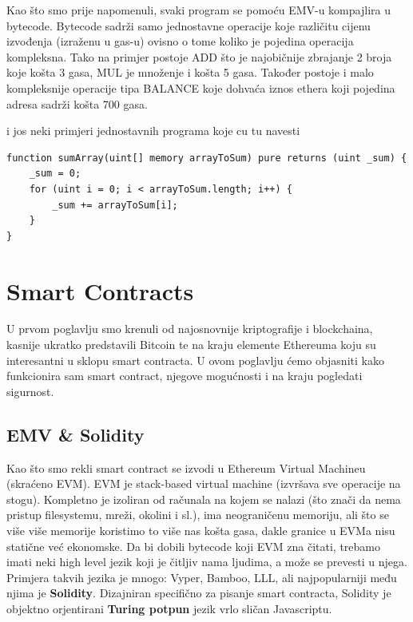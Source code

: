 \documentclass[12pt]{report}
\begin{document}
Kao što smo prije napomenuli, svaki program se pomoću EMV-u kompajlira u bytecode. Bytecode sadrži samo jednostavne operacije koje različitu cijenu izvođenja (izraženu u gas-u) ovisno o tome koliko je pojedina operacija kompleksna. Tako na primjer postoje ADD što je najobičnije zbrajanje 2 broja koje košta 3 gasa, MUL je množenje i košta 5 gasa. Također postoje i malo kompleksnije operacije tipa BALANCE koje dohvaća iznos ethera koji pojedina adresa sadrži košta 700 gasa.

i jos neki primjeri jednostavnih programa koje cu tu navesti

\begin{lstlisting}[caption = Primjer 1, language=solidity, label={lst:suma}]
function sumArray(uint[] memory arrayToSum) pure returns (uint _sum) {
    _sum = 0;
    for (uint i = 0; i < arrayToSum.length; i++) {
        _sum += arrayToSum[i];
    }
}
\end{lstlisting}

\chapter{Smart Contracts}

U prvom poglavlju smo krenuli od najosnovnije kriptografije i blockchaina, kasnije ukratko predstavili Bitcoin te na kraju elemente Ethereuma koju su interesantni u sklopu smart contracta. U ovom poglavlju ćemo objasniti kako funkcionira sam smart contract, njegove mogućnosti i na kraju pogledati sigurnost.

\section{EMV \& Solidity}

Kao što smo rekli smart contract se izvodi u Ethereum Virtual Machineu (skraćeno EVM). EVM je stack-based virtual machine (izvršava sve operacije na stogu). Kompletno je izoliran od računala na kojem se nalazi (što znači da nema pristup filesystemu, mreži, okolini i sl.), ima neograničenu memoriju, ali što se više više memorije koristimo to više nas košta gasa, dakle granice u EVMa nisu statične već ekonomske. Da bi dobili bytecode koji EVM zna čitati, trebamo imati neki high level jezik koji je čitljiv nama ljudima, a može se prevesti u njega. Primjera takvih jezika je mnogo: Vyper, Bamboo, LLL, ali najpopularniji među njima je \textbf{Solidity}. Dizajniran specifično za pisanje smart contracta, Solidity je objektno orjentirani \textbf{Turing potpun} jezik vrlo sličan Javascriptu.
\end{document}
